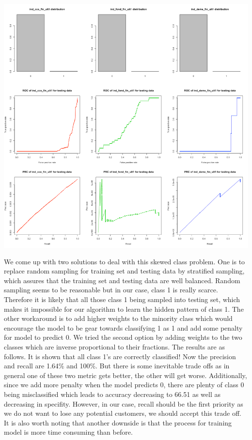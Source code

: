\documentclass{article}
\begin{document}
\vspace{5mm}
\includegraphics[scale = 0.8]{ROCandPR.png}
\vspace{5mm}

We come up with two solutions to deal with this skewed class problem. One is to replace random sampling for training set and testing data by stratified sampling, which assures that the training set and testing data are well balanced. Random sampling seems to be reasonable but in our case, class 1 is really scarce. Therefore it is likely that all those class 1 being sampled into testing set, which makes it impossible for our algorithm to learn the hidden pattern of class 1. The other workaround is to add higher weights to the minority class which would encourage the model to be gear towards classifying 1 as 1 and add some penalty for model to predict 0. We tried the second option by adding weights to the two classes which are inverse proportional to their fractions. The results are as follows. It is shown that all class 1’s are correctly classified! Now the precision and recall are 1.64\% and 100\%. But there is some inevitable trade offs as in general one of these two metric gets better, the other will get worse. Additionally, since we add more penalty when the model predicts 0, there are plenty of class 0 being misclassified which leads to accuracy decreasing to 66.51 as well as decreasing in specifity. However, in our case, recall should be the first priority as we do not want to lose any potential customers, we should accept this trade off. It is also worth noting that another downside is that the process for training model is more time consuming than before.
\end{document}
